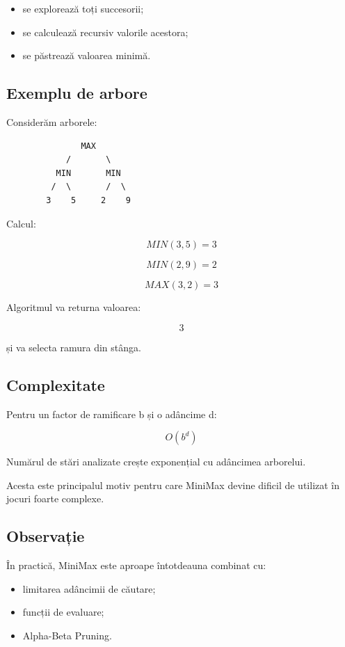 \documentclass[12pt,a4paper]{article}
\begin{document}
\begin{itemize}
\item se explorează toți succesorii;
\item se calculează recursiv valorile acestora;
\item se păstrează valoarea minimă.
\end{itemize}

\subsection{Exemplu de arbore}

Considerăm arborele:

\begin{verbatim}
               MAX
            /       \
          MIN       MIN
         /  \       /  \
        3    5     2    9
\end{verbatim}

Calcul:

\[
MIN(3,5)=3
\]

\[
MIN(2,9)=2
\]

\[
MAX(3,2)=3
\]

Algoritmul va returna valoarea:

\[
3
\]

și va selecta ramura din stânga.

\subsection{Complexitate}

Pentru un factor de ramificare b și o adâncime d:

\[
O(b^d)
\]

Numărul de stări analizate crește exponențial cu adâncimea arborelui.

Acesta este principalul motiv pentru care MiniMax devine dificil de utilizat în jocuri foarte complexe.

\subsection{Observație}

În practică, MiniMax este aproape întotdeauna combinat cu:

\begin{itemize}
\item limitarea adâncimii de căutare;
\item funcții de evaluare;
\item Alpha-Beta Pruning.
\end{itemize}
\end{document}
